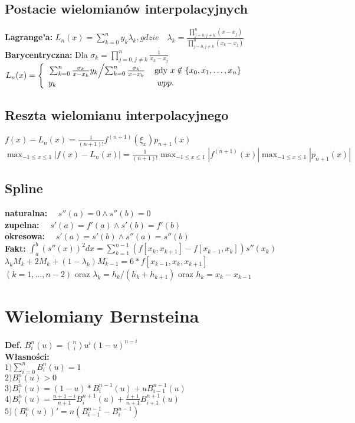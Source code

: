 \documentclass[a4paper,twocolumn]{article}
\begin{document}
\subsection{Postacie wielomianów interpolacyjnych}
\textbf{Lagrange'a:} $L_n(x) =\sum_{k=0}^ny_k
\lambda_k ,gdzie\quad \lambda_k=\frac{\prod_{j=0, j\neq k}^{n}(x-x_j)}{\prod_{j=0, j\neq k}^{n}(x_k-x_j)}$\\
\textbf{Barycentryczna:}
Dla $\sigma_k = \prod^n_{j=0, j\neq k}\frac{1}{x_k-x_j}$\\
$  L_n(x) = \left\{ \begin{array}{ll}
\left. \sum_{k=0}^n\frac{\sigma_k}{x-x_k}y_k \middle/ \sum_{k=0}^n\frac{\sigma_k}{x-x_k} \right. & \textrm{gdy $x \notin \left\{ x_0,x_1,\dots,x_n \right\} $}\\
y_k & \textrm{ $ wpp. $}
\end{array} \right.
$

\subsection{Reszta wielomianu interpolacyjnego}
$f(x)-L_n(x) = \frac{1}{(n+1)!}f^{(n+1)}(\xi_x)p_{n+1}(x)$\\
$\max_{-1\leq x \leq 1} | f(x)-L_n(x) | = \frac{1}{(n+1)!}\max_{-1\leq x \leq 1} | f^{(n+1)}(x) | \max_{-1\leq x \leq 1} | p_{n+1}(x) |$

\subsection{Spline}
\textbf{naturalna:} $\quad s''(a)=0 \land s''(b)=0$\\
\textbf{zupelna:} $\quad s'(a)=f'(a) \land s'(b)=f'(b)$\\
\textbf{okresowa:} $\quad s'(a)=s'(b) \land s''(a)=s''(b)$\\
\textbf{Fakt:} $\int_a^b \left(s''(x)\right)^2 dx = \sum_{k=1}^{n-1} \left( f\left[x_k,x_{k+1}\right] - f\left[x_{k-1},x_k\right]\right)s''(x_k) $\\
$\lambda_{k}M_{k}+2M_{k}+(1-\lambda_{k})M_{k-1}=6*f[x_{k-1},x_{k},x_{k+1}]$\\ $(k=1,...,n-2)$ oraz $\lambda_{k} = h_{k}/(h_{k}+h_{k+1})$ oraz $h_{k}=x_{k} - x_{k-1}$

\section{Wielomiany Bernsteina}

\textbf{Def.} $B_i^n(u) = {\binom{n}{i}}u^i(1-u)^{n-i} $ \\
\textbf{Własności:} \\
$1) \sum_{i=0}^{n} B_i^n(u) = 1$\\
$2) B_i^n(u) > 0$\\
$3) B_i^n(u) = (1-u)*B_i^{n-1}(u)+uB_{i-1}^{n-1}(u)$\\
$4) B_i^n(u) = \frac{n+1-i}{n+1}B_i^{n+1}(u) + \frac{i+1}{n+1}B_{i+1}^{n+1}(u)$\\
$5) \left(B_i^n(u)\right)' = n\left( B_{i-1}^{n-1} -B_{i}^{n-1} \right)$
\end{document}
